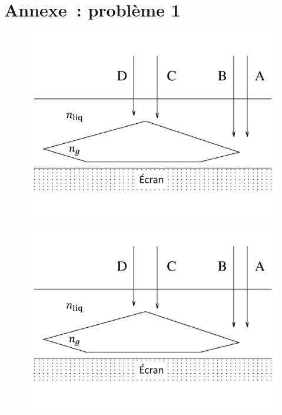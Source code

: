 \documentclass[a4paper, 10pt, garamond, oneside]{book}
\begin{document}
{	\newpage
	\chapter*{Annexe~: problème 1}
	\begin{figure}[htbp]
		\centering
		{\includegraphics[width=.7\linewidth]{gemme_e}}
		{\includegraphics[width=.7\linewidth]{gemme_e}}
		\caption{}
    \label{fig:gemmes}
	\end{figure}

	\newpage
}
\end{document}
